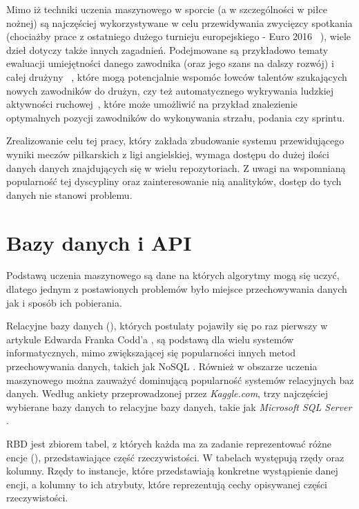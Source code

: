 Mimo iż techniki uczenia maszynowego w sporcie (a w szczególności w piłce nożnej) są najczęściej wykorzystywane w celu przewidywania zwycięzcy spotkania (chociażby prace z ostatniego dużego turnieju europejskiego - Euro 2016~\cite{Euro2016-1} \cite{Euro2016-2} \cite{Euro2016-3}), wiele dzieł dotyczy także innych zagadnień. Podejmowane są przykładowo tematy ewaluacji umiejętności danego zawodnika (oraz jego szans na dalszy rozwój) i całej drużyny~\cite{ml_soccer_analytics} \cite{soccer_players_skill}, które mogą potencjalnie wspomóc łowców talentów szukających nowych zawodników do drużyn, czy też automatycznego wykrywania ludzkiej aktywności ruchowej~\cite{activity_recignition}, które może umożliwić na przykład znalezienie optymalnych pozycji zawodników do wykonywania strzału, podania czy sprintu.

Zrealizowanie celu tej pracy, który zakłada zbudowanie systemu przewidującego wyniki meczów piłkarskich z ligi angielskiej, wymaga dostępu do dużej ilości danych danych znajdujących się w wielu repozytoriach. Z uwagi na wspomnianą popularność tej dyscypliny oraz zainteresowanie nią analityków, dostęp do tych danych nie stanowi problemu.

\section{Bazy danych i API}
Podstawą uczenia maszynowego są dane na których algorytmy mogą się uczyć, dlatego jednym z postawionych problemów było miejsce przechowywania danych jak i sposób ich pobierania.

Relacyjne bazy danych (), których postulaty pojawiły się po raz pierwszy w artykule Edwarda Franka Codd'a \cite{Codd}, są podstawą dla wielu systemów informatycznych, mimo zwiększającej się popularności innych metod przechowywania danych, takich jak NoSQL \cite{RBD_popularity_2016}. Również w obszarze uczenia maszynowego można zauważyć dominującą popularność systemów relacyjnych baz danych. Według ankiety przeprowadzonej przez \textit{Kaggle.com}, trzy najczęściej wybierane bazy danych to relacyjne bazy danych, takie jak \textit{Microsoft SQL Server} \cite{RDB_popularity_kaggle_2020}.

RBD jest zbiorem tabel, z których każda ma za zadanie reprezentować różne encje (), przedstawiające część rzeczywistości. W tabelach występują rzędy oraz kolumny. Rzędy to instancje, które przedstawiają konkretne wystąpienie danej encji, a kolumny to ich atrybuty, które reprezentują cechy opisywanej części rzeczywistości. 

